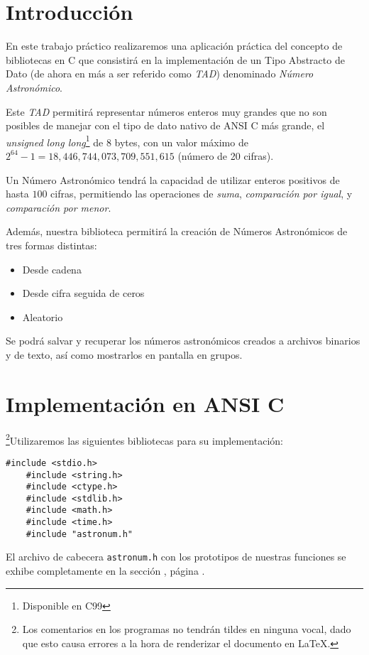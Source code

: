 \documentclass[a4paper, 12pt]{article}
\begin{document}
\section{Introducción} \label{intro}
\bigbreak
En este trabajo práctico realizaremos una aplicación práctica del concepto de bibliotecas en C que consistirá en la implementación de un Tipo Abstracto de Dato (de ahora en más a ser referido como \emph{TAD}) denominado \emph{Número Astronómico}.

Este \emph{TAD} permitirá representar números enteros muy grandes que no son posibles de manejar con el tipo de dato nativo de ANSI C más grande, el \emph{unsigned long long}\footnote{Disponible en C99} de 8 bytes, con un valor máximo de $2^{64}-1 = 18,446,744,073,709,551,615$ (número de 20 cifras).

Un Número Astronómico tendrá la capacidad de utilizar enteros positivos de hasta $100$ cifras, permitiendo las operaciones de \emph{suma}, \emph{comparación por igual}, y \emph{comparación por menor}.

Además, nuestra biblioteca permitirá la creación de Números Astronómicos de tres formas distintas:

\begin{itemize}
    \item Desde cadena
    \item Desde cifra seguida de ceros
    \item Aleatorio
\end{itemize}

Se podrá salvar y recuperar los números astronómicos creados a archivos binarios y de texto, así como mostrarlos en pantalla en grupos.

\section{Implementación en ANSI C} \label{implementacion}
\bigbreak
\footnote{Los comentarios en los programas no tendrán tildes en ninguna vocal, dado que esto causa errores a la hora de renderizar el documento en \LaTeX.}Utilizaremos las siguientes bibliotecas para su implementación:

\begin{lstlisting}[style=C]
    #include <stdio.h>
    #include <string.h>
    #include <ctype.h>
    #include <stdlib.h>
    #include <math.h>
    #include <time.h>
    #include "astronum.h"
\end{lstlisting}

El archivo de cabecera \verb|astronum.h| con los prototipos de nuestras funciones se exhibe completamente en la sección , página \pageref{header-astronum}.
\end{document}
